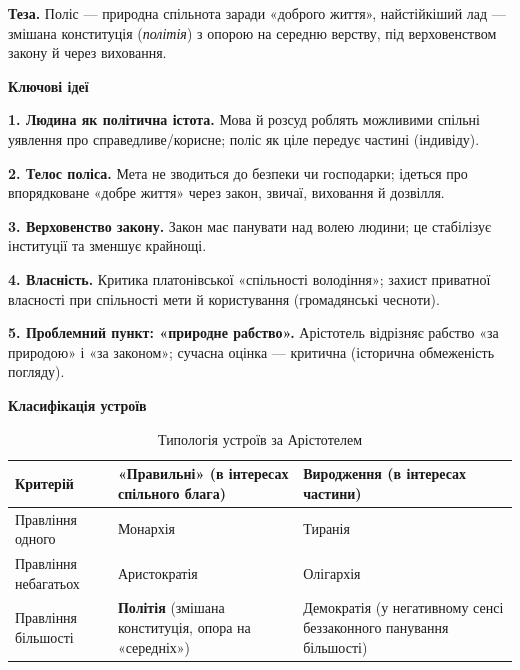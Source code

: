 \documentclass[12pt,a4paper]{article}
\begin{document}
\textbf{Теза.} Поліс — природна спільнота заради «доброго життя», найстійкіший лад — змішана конституція (\textit{політія}) з опорою на середню верству, під верховенством закону й через виховання.

\vspace{0.8em}
\begin{center}\textbf{\large Ключові ідеї}\end{center}

\textbf{1. Людина як політична істота.} Мова й розсуд роблять можливими спільні уявлення про справедливе/корисне; поліс як ціле передує частині (індивіду).

\textbf{2. Телос поліса.} Мета не зводиться до безпеки чи господарки; ідеться про впорядковане «добре життя» через закон, звичаї, виховання й дозвілля.

\textbf{3. Верховенство закону.} Закон має панувати над волею людини; це стабілізує інституції та зменшує крайнощі.

\textbf{4. Власність.} Критика платонівської «спільності володіння»; захист приватної власності при спільності мети й користування (громадянські чесноти).

\textbf{5. Проблемний пункт: «природне рабство».} Арістотель відрізняє рабство «за природою» і «за законом»; сучасна оцінка — критична (історична обмеженість погляду).

\vspace{0.8em}
\begin{center}\textbf{\large Класифікація устроїв}\end{center}

\setlength{\tabcolsep}{6pt}
\renewcommand{\arraystretch}{1.2}
\begin{table}[h!]
\centering
\begin{tabular}{|m{3.2cm}|m{5.2cm}|m{5.2cm}|}
\hline
\textbf{Критерій} & \textbf{«Правильні» (в інтересах спільного блага)} & \textbf{Виродження (в інтересах частини)} \\ \hline
Правління одного & Монархія & Тиранія \\ \hline
Правління небагатьох & Аристократія & Олігархія \\ \hline
Правління більшості & \textbf{Політія} (змішана конституція, опора на «середніх») & Демократія (у негативному сенсі беззаконного панування більшості) \\ \hline
\end{tabular}
\caption{Типологія устроїв за Арістотелем}
\end{table}
\end{document}
